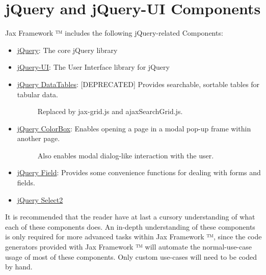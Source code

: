 \documentclass[letterpaper,10pt,english]{sphinxmanual}
\begin{document}
\section{jQuery and jQuery-UI Components}
\label{jaxFrameworkGuide:jquery-and-jquery-ui-components}
Jax Framework ™ includes the following jQuery-related Components:
\begin{itemize}
\item {} 
\href{http://jquery.com/}{jQuery}: The core jQuery library

\item {} 
\href{http://jqueryui.com/}{jQuery-UI}: The User Interface library for jQuery

\item {} \begin{description}
\item[{\href{http://datatables.net/}{jQuery DataTables}: {[}DEPRECATED{]}  Provides searchable, sortable tables for tabular data.}] \leavevmode
Replaced by jax-grid.js and ajaxSearchGrid.js.

\end{description}

\item {} \begin{description}
\item[{\href{http://www.jacklmoore.com/colorbox/}{jQuery ColorBox}: Enables opening a page in a modal pop-up frame within another page.}] \leavevmode
Also enables modal dialog-like interaction with the user.

\end{description}

\item {} 
\href{http://www.pengoworks.com/workshop/jquery/field/field.plugin.htm}{jQuery Field}: Provides some convenience functions for dealing with forms and fields.

\item {} 
\href{http://ivaynberg.github.com/select2/}{jQuery Select2}

\end{itemize}

It is recommended that the reader have at last a cursory understanding of what each of these components
does.  An in-depth understanding of these components is only required for more advanced tasks within
Jax Framework ™, since the code generators provided with Jax Framework ™ will automate
the normal-use-case usage of most of these components.  Only custom use-cases will need to be coded
by hand.
\end{document}

